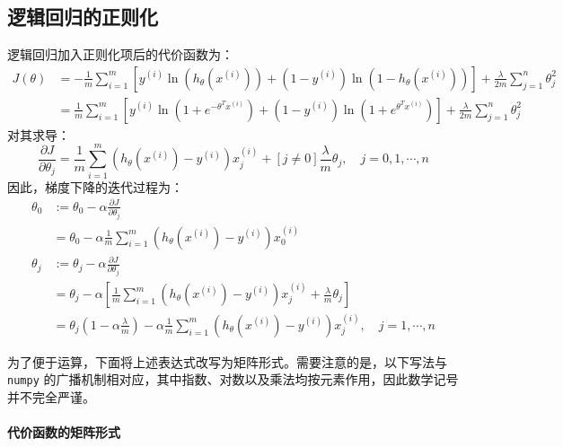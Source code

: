 \subsection{逻辑回归的正则化}

逻辑回归加入正则化项后的代价函数为：
\begin{align*}
J(\theta)&=-\frac{1}{m}\sum_{i=1}^m\left[y^{(i)}\ln(h_\theta(x^{(i)}))+(1-y^{(i)})\ln(1-h_\theta(x^{(i)}))\right]+\frac{\lambda}{2m}\sum_{j=1}^n\theta_j^2\\
&=\frac{1}{m}\sum_{i=1}^m\left[y^{(i)}\ln\left(1+e^{-\theta^Tx^{(i)}}\right)+\left(1-y^{(i)}\right)\ln\left(1+e^{\theta^Tx^{(i)}}\right)\right]+\frac{\lambda}{2m}\sum_{j=1}^n\theta_j^2
\end{align*}
对其求导：
\[
\frac{\partial J}{\partial \theta_j}=\frac{1}{m}\sum_{i=1}^m\left(h_\theta(x^{(i)})-y^{(i)}\right)x^{(i)}_j+[j\neq 0]\frac{\lambda}{m}\theta_j,\quad j=0,1,\cdots,n
\]
因此，梯度下降的迭代过程为：
\begin{align*}
\theta_0&:=\theta_0-\alpha\frac{\partial J}{\partial\theta_j}\\
&=\theta_0-\alpha\frac{1}{m}\sum_{i=1}^m\left(h_\theta(x^{(i)})-y^{(i)}\right)x_0^{(i)}
\\
\theta_j&:=\theta_j-\alpha \frac{\partial J}{\partial \theta_j}\\
&=\theta_j-\alpha \left[\frac{1}{m}\sum_{i=1}^m\left(h_\theta(x^{(i)})-y^{(i)}\right)x^{(i)}_j+\frac{\lambda}{m}\theta_j\right]\\
&=\theta_j\left(1-\alpha\frac{\lambda}{m}\right)-\alpha\frac{1}{m}\sum_{i=1}^m\left(h_\theta(x^{(i)})-y^{(i)}\right)x^{(i)}_j,\quad j=1,\cdots,n
\end{align*}

为了便于运算，下面将上述表达式改写为矩阵形式。需要注意的是，以下写法与 \texttt{numpy} 的广播机制相对应，其中指数、对数以及乘法均按元素作用，因此数学记号并不完全严谨。


\paragraph{代价函数的矩阵形式}

